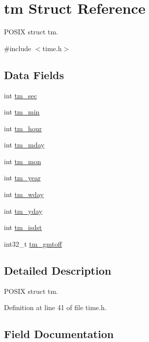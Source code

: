 \hypertarget{structtm}{}\section{tm Struct Reference}
\label{structtm}


P\+O\+S\+IX struct tm.  




{\ttfamily \#include $<$time.\+h$>$}

\subsection*{Data Fields}
\begin{DoxyCompactItemize}
\item 
int \hyperlink{structtm_a4d098a9a5c03a00b2ee61e10851de81e}{tm\+\_\+sec}
\item 
int \hyperlink{structtm_af414eb7c86cc3099595211eee4d4211b}{tm\+\_\+min}
\item 
int \hyperlink{structtm_a3e7ca4e37f1abcaf56b8a916c38eb9fe}{tm\+\_\+hour}
\item 
int \hyperlink{structtm_ab8d8904bad43b0c8b96e61941c5b5310}{tm\+\_\+mday}
\item 
int \hyperlink{structtm_a112ac36fa2f593777138a417cf031e17}{tm\+\_\+mon}
\item 
int \hyperlink{structtm_a33adf78fd6476b2120ce3b9c4a852053}{tm\+\_\+year}
\item 
int \hyperlink{structtm_afe81a8c46f1c693c43f259b288859f4f}{tm\+\_\+wday}
\item 
int \hyperlink{structtm_a93a0ba77cc23796df84405dcbcc57eb1}{tm\+\_\+yday}
\item 
int \hyperlink{structtm_a5645ca0580c8ab2c24f6c2965d9c9f9c}{tm\+\_\+isdst}
\item 
int32\+\_\+t \hyperlink{structtm_a6b7d1fb16f21197ea027e364e2812c3d}{tm\+\_\+gmtoff}
\end{DoxyCompactItemize}


\subsection{Detailed Description}
P\+O\+S\+IX struct tm. 

Definition at line 41 of file time.\+h.



\subsection{Field Documentation}
\mbox{\label{structtm_a6b7d1fb16f21197ea027e364e2812c3d}} 
